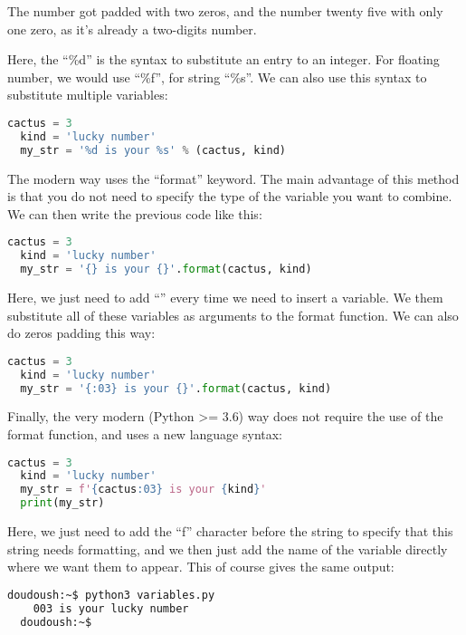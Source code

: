 The number got padded with two zeros, and the number twenty five with only one zero,
as it's already a two-digits number.

\vspace{5mm}

Here, the ``\%d'' is the syntax to substitute an entry to an integer. For floating
number, we would use ``\%f'', for string ``\%s''. We can also use this syntax to
substitute multiple variables:

\begin{lstlisting}[language=python]
  cactus = 3
  kind = 'lucky number'
  my_str = '%d is your %s' % (cactus, kind)
\end{lstlisting}


The modern way uses the ``format'' keyword. The main advantage of this method is
that you do not need to specify the type of the variable you want to combine.
We can then write the previous code like this:

\begin{lstlisting}[language=python]
  cactus = 3
  kind = 'lucky number'
  my_str = '{} is your {}'.format(cactus, kind)
\end{lstlisting}

Here, we just need to add ``{}'' every time we need to insert a variable. We them
substitute all of these variables as arguments to the format function. We can also
do zeros padding this way:

\begin{lstlisting}[language=python]
  cactus = 3
  kind = 'lucky number'
  my_str = '{:03} is your {}'.format(cactus, kind)
\end{lstlisting}

Finally, the very modern (Python >= 3.6) way does not require the use of the format
function, and uses a new language syntax:

\begin{lstlisting}[language=python]
  cactus = 3
  kind = 'lucky number'
  my_str = f'{cactus:03} is your {kind}'
  print(my_str)
\end{lstlisting}

Here, we just need to add the ``f'' character before the string to specify that
this string needs formatting, and we then just add the name of the variable directly
where we want them to appear. This of course gives the same output:

\begin{lstlisting}[language=bash]
  doudoush:~$ python3 variables.py
    003 is your lucky number
  doudoush:~$
\end{lstlisting}

